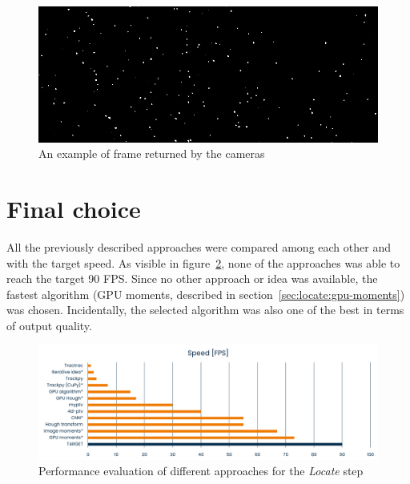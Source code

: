 \begin{figure}[H]
	\centerline{\includegraphics[width=\locateimgsize]{images/locate/_original-frame.png}}
	\caption{\centering An example of frame returned by the cameras}
	\label{fig:locate:original-crop}
\end{figure}


\newpage
 \newpage
 \newpage
 \newpage
 \newpage
 \newpage
 \newpage
 \newpage
 \newpage
 \newpage
 \newpage
 \newpage
 \newpage
 \newpage

\section{Final choice}

All the previously described approaches were compared among each other and with the target speed.
As visible in figure~\ref{fig:locate:speed}, none of the approaches was able to reach the target 90 FPS.
Since no other approach or idea was available, the fastest algorithm (GPU moments, described in section~\ref{sec:locate:gpu-moments}) was chosen.
Incidentally, the selected algorithm was also one of the best in terms of output quality.

\begin{figure}
	\centerline{\includegraphics[width=\textwidth]{images/locate-speed-comparison.png}}
	\caption{\centering Performance evaluation of different approaches for the \textit{Locate} step}
	\label{fig:locate:speed}
\end{figure}

